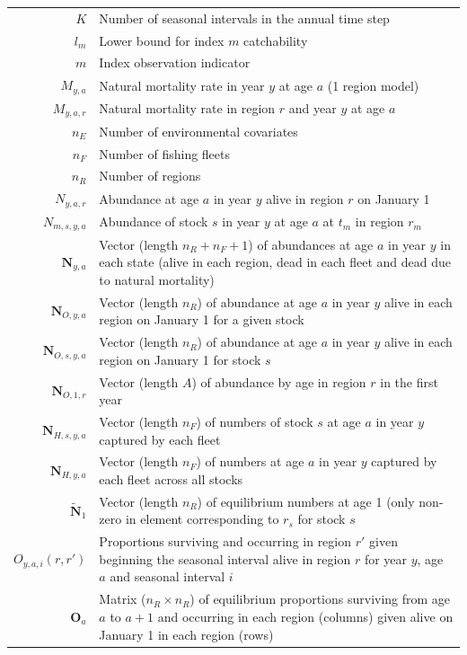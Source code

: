 \documentclass[
]{article}
\begin{document}
\begin{longtable}[c]{r p{}}
$K$ & Number of seasonal intervals in the annual time step\\
$l_{m}$ & Lower bound for index $m$ catchability\\
$m$ & Index observation indicator\\
$M_{y,a}$ &  Natural mortality rate in year $y$ at age $a$ (1 region model)\\
$M_{y,a,r}$ & Natural mortality rate in region $r$ and year $y$ at age $a$\\
$n_E$ & Number of environmental covariates\\
$n_F$ & Number of fishing fleets\\
$n_R$ & Number of regions\\
$N_{y,a,r}$ & Abundance at age $a$ in year $y$ alive in region $r$ on January 1\\
$N_{m,s,y,a}$ & Abundance of stock $s$ in year $y$ at age $a$ at $t_m$ in region $r_m$\\
$\mathbf{N}_{y,a}$ & Vector (length $n_R + n_F + 1$) of abundances at age $a$ in year $y$ in each state (alive in each region, dead in each fleet and dead due to natural mortality)\\
$\mathbf{N}_{O,y,a}$ & Vector (length $n_R$) of abundance at age $a$ in year $y$ alive in each region on January 1 for a given stock\\
$\mathbf{N}_{O,s,y,a}$ & Vector (length $n_R$) of abundance at age $a$ in year $y$ alive in each region on January 1 for stock $s$\\
$\mathbf{N}_{O,1,r}$ & Vector (length $A$) of abundance by age in region $r$ in the first year\\
$\mathbf{N}_{H,s,y,a}$ & Vector (length $n_F$) of numbers of stock $s$ at age $a$ in year $y$ captured by each fleet\\
$\mathbf{N}_{H,y,a}$ & Vector (length $n_F$) of numbers at age $a$ in year $y$ captured by each fleet across all stocks\\
$\widetilde{\mathbf{N}}_{1}$ & Vector (length $n_R$) of equilibrium numbers at age 1 (only non-zero in element corresponding to $r_s$ for stock $s$\\
$O_{y,a,i}(r,r')$ & Proportions surviving and occurring in region $r'$ given beginning the seasonal interval alive in region $r$ for year $y$, age $a$ and seasonal interval $i$\\
$\mathbf{O}_{a}$ & Matrix ($n_R \times n_R$) of equilibrium proportions surviving from age $a$ to $a+1$ and occurring in each region (columns) given alive on January 1 in each region (rows)\\

\end{longtable}
\end{document}
